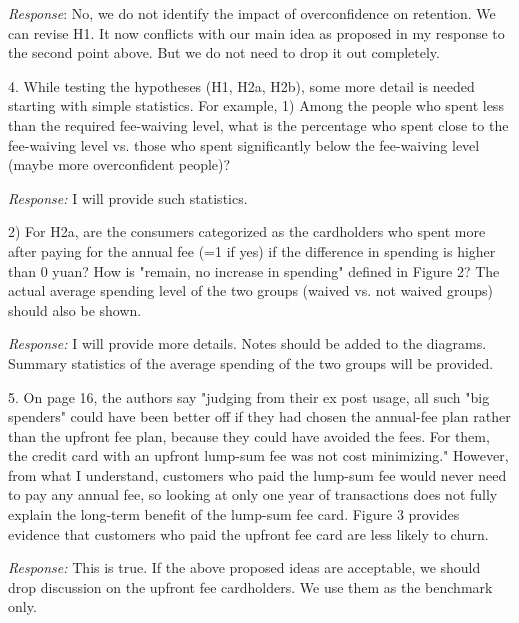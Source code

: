 \documentclass[titlepage,12pt,letterpaper]{article}
\numberwithin{equation}{section}
\begin{document}
\emph{Response}: No, we do not identify the impact of overconfidence on retention. We can revise H1. It now conflicts with our main idea as proposed in my response to the second point above. But we do not need to drop it out completely. 

4. 	While testing the hypotheses (H1, H2a, H2b), some more detail is needed starting with simple statistics. For example,
1) 	Among the people who spent less than the required fee-waiving level, what is the percentage who spent close to the fee-waiving level vs. those who spent significantly below the fee-waiving level (maybe more overconfident people)?

\emph{Response:} I will provide such statistics. 

2) 	For H2a, are the consumers categorized as the cardholders who spent more after paying for the annual fee (=1 if yes) if the difference in spending is higher than 0 yuan? How is "remain, no increase in spending" defined in Figure 2? The actual average spending level of the two groups (waived vs. not waived groups) should also be shown.

\emph{Response:} I will provide more details. Notes should be added to the diagrams. Summary statistics of the average spending of the two groups will be provided. 

5. 	On page 16, the authors say "judging from their ex post usage, all such "big spenders" could have been better off if they had chosen the annual-fee plan rather than the upfront fee plan, because they could have avoided the fees. For them, the credit card with an upfront lump-sum fee was not cost minimizing." However, from what I understand, customers who paid the lump-sum fee would never need to pay any annual fee, so looking at only one year of transactions does not fully explain the long-term benefit of the lump-sum fee card. Figure 3 provides evidence that customers who paid the upfront fee card are less likely to churn.

\emph{Response:} This is true. If the above proposed ideas are acceptable, we should drop discussion on the upfront fee cardholders. We use them as the benchmark only. 
\end{document}
